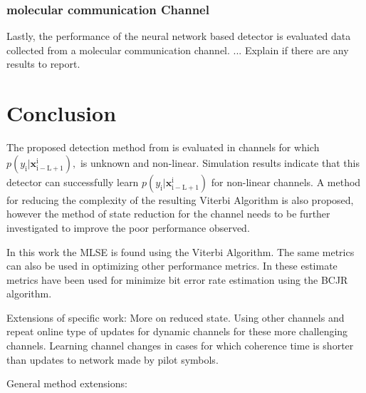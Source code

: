 \documentclass[12pt,a4paper]{report}
\begin{document}
\subsubsection{molecular communication Channel}
Lastly, the performance of the neural network based detector is evaluated data collected from a molecular communication channel. ... Explain if there are any results to report. 

\section{Conclusion}
The proposed detection method from \cite{shlezinger2019viterbinet} is evaluated in channels for which $p(y_{\mathrm{i}}|\mathbf{x}_{\mathrm{i-L+1}}^{\mathrm{i}}),$ is unknown and non-linear. Simulation results indicate that this detector can successfully learn
$p(y_{\mathrm{i}}|\mathbf{x}_{\mathrm{i-L+1}}^{\mathrm{i}})$ for non-linear channels. A method for reducing the complexity of the resulting Viterbi Algorithm is also proposed, however the method of state reduction for the channel needs to be further investigated to improve the poor performance observed. 
\par 
In this work the MLSE is found using the Viterbi Algorithm. The same metrics can also be used in optimizing other performance metrics. In \cite{shlezinger2020datadriven} these estimate metrics have been used for minimize bit error rate estimation using the BCJR algorithm. 

Extensions of specific work: 
More on reduced state.
Using other channels and repeat online type of updates for dynamic channels for these more challenging channels. 
Learning channel changes in cases for which coherence time is shorter than updates to network made by pilot symbols. 

General method extensions:


\newpage
{}

\end{document}
